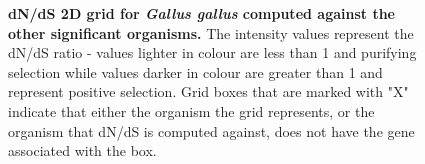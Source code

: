 \documentclass{article}
\begin{document}
\begin{figure}[H]
\centering
{}
\caption{\textbf{dN/dS 2D grid for \textit{Gallus gallus} computed against the other significant organisms.} The intensity values represent the dN/dS ratio - values lighter in colour are less than 1 and purifying selection while values darker in colour are greater than 1 and represent positive selection. Grid boxes that are marked with "X" indicate that either the organism the grid represents, or the organism that dN/dS is computed against, does not have the gene associated with the box.}
\label{sup_fig_26}
\end{figure}
\end{document}
